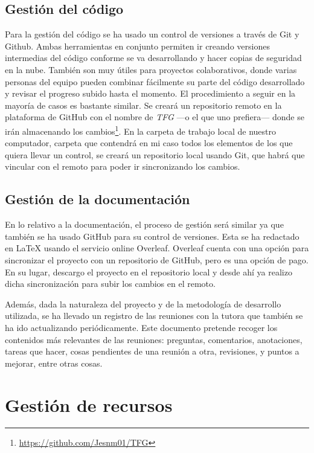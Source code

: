 \subsection{Gestión del código}
Para la gestión del código se ha usado un control de versiones a través de Git y Github. Ambas herramientas en conjunto permiten ir creando versiones intermedias del código conforme se va desarrollando y hacer copias de seguridad en la nube. También son muy útiles para proyectos colaborativos, donde varias personas del equipo pueden combinar fácilmente su parte del código desarrollado y revisar el progreso subido hasta el momento.
El procedimiento a seguir en la mayoría de casos es bastante similar. Se creará un repositorio remoto en la plataforma de GitHub con el nombre de \emph{TFG} —o el que uno prefiera— donde se irán almacenando los cambios\footnote{\url{https://github.com/Jesnm01/TFG}}. En la carpeta de trabajo local de nuestro computador, carpeta que contendrá en mi caso todos los elementos de los que quiera llevar un control, se creará un repositorio local usando Git, que habrá que vincular con el remoto para poder ir sincronizando los cambios. 


\subsection{Gestión de la documentación}
En lo relativo a la documentación, el proceso de gestión será similar ya que también se ha usado GitHub para su control de versiones. Esta se ha redactado en LaTeX usando el servicio online Overleaf. Overleaf cuenta con una opción para sincronizar el proyecto con un repositorio de GitHub, pero es una opción de pago. En su lugar, descargo el proyecto en el repositorio local y desde ahí ya realizo dicha sincronización para subir los cambios en el remoto.

Además, dada la naturaleza del proyecto y de la metodología de desarrollo utilizada, se ha llevado un registro de las reuniones con la tutora que también se ha ido actualizando periódicamente. Este documento pretende recoger los contenidos más relevantes de las reuniones: preguntas, comentarios, anotaciones, tareas que hacer, cosas pendientes de una reunión a otra, revisiones, y puntos a mejorar, entre otras cosas.



\section{Gestión de recursos} \label{gestion_recursos}

